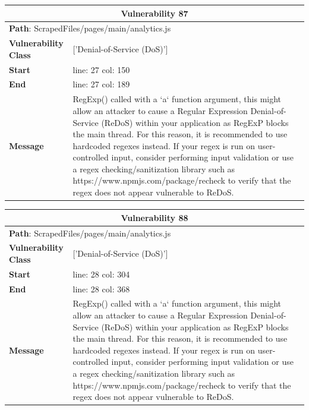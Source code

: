 \documentclass[12pt]{article}
\begin{document}
\vspace{0.7cm}
\FloatBarrier
\begin{table}[!h]
\centering
\renewcommand{\arraystretch}{1.3}
\begin{tabular}{|l|p{10cm}|}
\hline
\multicolumn{2}{|c|}{\textbf{Vulnerability 87}} \\
\hline
\multicolumn{2}{|l|}{\textbf{Path}: ScrapedFiles/pages/main/analytics.js} \\
\hline
\textbf{Vulnerability Class} & ['Denial-of-Service (DoS)'] \\
\hline
\textbf{Start} & line: 27 \quad col: 150 \\
\hline
\textbf{End} & line: 27 \quad col: 189 \\
\hline
\textbf{Message} & RegExp() called with a `a` function argument, this might allow an attacker to cause a Regular Expression Denial-of-Service (ReDoS) within your application as RegExP blocks the main thread. For this reason, it is recommended to use hardcoded regexes instead. If your regex is run on user-controlled input, consider performing input validation or use a regex checking/sanitization library such as https://www.npmjs.com/package/recheck to verify that the regex does not appear vulnerable to ReDoS. \\
\hline
\end{tabular}
\end{table}
\vspace{0.7cm}
\FloatBarrier
\begin{table}[!h]
\centering
\renewcommand{\arraystretch}{1.3}
\begin{tabular}{|l|p{10cm}|}
\hline
\multicolumn{2}{|c|}{\textbf{Vulnerability 88}} \\
\hline
\multicolumn{2}{|l|}{\textbf{Path}: ScrapedFiles/pages/main/analytics.js} \\
\hline
\textbf{Vulnerability Class} & ['Denial-of-Service (DoS)'] \\
\hline
\textbf{Start} & line: 28 \quad col: 304 \\
\hline
\textbf{End} & line: 28 \quad col: 368 \\
\hline
\textbf{Message} & RegExp() called with a `a` function argument, this might allow an attacker to cause a Regular Expression Denial-of-Service (ReDoS) within your application as RegExP blocks the main thread. For this reason, it is recommended to use hardcoded regexes instead. If your regex is run on user-controlled input, consider performing input validation or use a regex checking/sanitization library such as https://www.npmjs.com/package/recheck to verify that the regex does not appear vulnerable to ReDoS. \\
\hline
\end{tabular}
\end{table}
\end{document}
